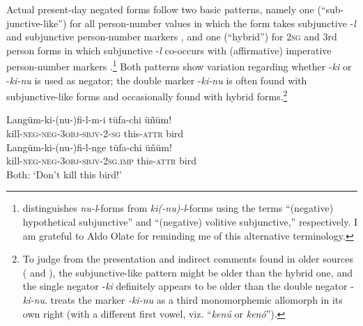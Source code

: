 \documentclass[output=paper,colorlinks,citecolor=brown,draft]{langscibook}
\begin{document}
Actual present-day negated forms follow two basic patterns, namely one (“sub-junctive-like”) for all person-number values in which the form takes subjunctive \nobreakdash-\textit{l} and subjunctive person-number markers , and one (“hybrid”) for \textsc{2sg} and 3rd person forms in which subjunctive \nobreakdash-\textit{l} co-occurs with (affirmative) imperative person-number markers .\footnote{\citet[146]{Salas2006} distinguishes \textit{nu-l}{}-forms from \textit{ki(-nu)-l}{}-forms using the terms “(negative) hypothetical subjunctive” and “(negative) volitive subjunctive,” respectively. I am grateful to Aldo Olate for reminding me of this alternative terminology.} Both patterns show variation regarding whether \nobreakdash-\textit{ki} or \nobreakdash-\textit{ki-nu} is used as negator; the double marker \nobreakdash-\textit{ki-nu} is often found with subjunctive-like forms and occasionally found with hybrid forms.\footnote{To judge from the presentation and indirect comments found in older sources (\citealt[23--24]{Valdivia1606} and \citealt[166--167]{Augusta1903}), the subjunctive-like pattern might be older than the hybrid one, and the single negator \nobreakdash-\textit{ki} definitely appears to be older than the double negator \nobreakdash-\textit{ki-nu}. \citet[124--126]{Moesbach1962} treats the marker \textit{\nobreakdash-ki\nobreakdash-nu} as a third monomorphemic allomorph in its own right (with a different first vowel, viz. “\textit{kenú} or \textit{kenó}”).} 

\ea\label{ex:mapu:4}    
    \ea\label{ex:mapu:4a}
        \gll Langüm-ki-(nu-)fi-l-m-i tüfa-chi üñüm!\\
             kill-\textsc{neg-neg-3obj-sbjv-2-sg} this-\textsc{attr} bird\\
        \glt
    \ex\label{ex:mapu:4b}
        \gll Langüm-ki-(nu-)fi-l-nge tüfa-chi üñüm!\\
             kill-\textsc{neg-neg-3obj-sbjv-2sg.imp} this-\textsc{attr} bird \\
        \glt Both: ‘Don’t kill this bird!’
    \z
\z 
\end{document}
